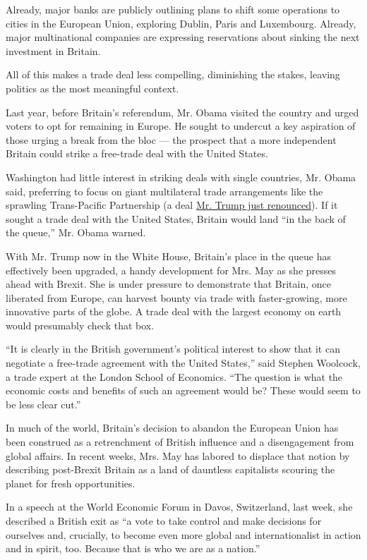 Already, major banks are publicly outlining plans to shift some
operations to cities in the European Union, exploring Dublin, Paris and
Luxembourg. Already, major multinational companies are expressing
reservations about sinking the next investment in Britain.

All of this makes a trade deal less compelling, diminishing the stakes,
leaving politics as the most meaningful context.

Last year, before Britain's referendum, Mr. Obama visited the country
and urged voters to opt for remaining in Europe. He sought to undercut a
key aspiration of those urging a break from the bloc --- the prospect
that a more independent Britain could strike a free-trade deal with the
United States.

Washington had little interest in striking deals with single countries,
Mr. Obama said, preferring to focus on giant multilateral trade
arrangements like the sprawling Trans-Pacific Partnership (a deal
\href{https://www.nytimes.com/2017/01/23/us/politics/tpp-trump-trade-nafta.html?_r=0}{Mr.
Trump just renounced}). If it sought a trade deal with the United
States, Britain would land ``in the back of the queue,'' Mr. Obama
warned.

With Mr. Trump now in the White House, Britain's place in the queue has
effectively been upgraded, a handy development for Mrs. May as she
presses ahead with Brexit. She is under pressure to demonstrate that
Britain, once liberated from Europe, can harvest bounty via trade with
faster-growing, more innovative parts of the globe. A trade deal with
the largest economy on earth would presumably check that box.

``It is clearly in the British government's political interest to show
that it can negotiate a free-trade agreement with the United States,''
said Stephen Woolcock, a trade expert at the London School of Economics.
``The question is what the economic costs and benefits of such an
agreement would be? These would seem to be less clear cut.''

In much of the world, Britain's decision to abandon the European Union
has been construed as a retrenchment of British influence and a
disengagement from global affairs. In recent weeks, Mrs. May has labored
to displace that notion by describing post-Brexit Britain as a land of
dauntless capitalists scouring the planet for fresh opportunities.

In a speech at the World Economic Forum in Davos, Switzerland, last
week, she described a British exit as ``a vote to take control and make
decisions for ourselves and, crucially, to become even more global and
internationalist in action and in spirit, too. Because that is who we
are as a nation.''

